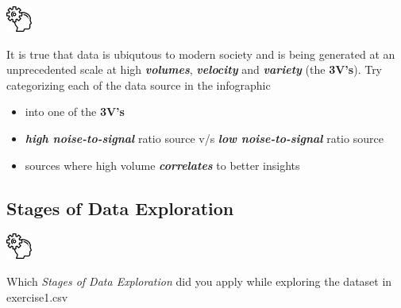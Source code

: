 \begin{minipage}[ht]{0.2\linewidth}
    \includegraphics[width=2\baselineskip]{./viz/icons/Think.png}  
\end{minipage}%
\begin{minipage}[ht]{0.75\linewidth}
It is true that data is ubiqutous to modern society and is being generated at an unprecedented scale at high \textbf{\emph{volumes}}, \textbf{\emph{velocity}} and \textbf{\emph{variety}} (the \textbf{3V's}). Try categorizing each of the data source in the infographic
\begin{itemize}
  \item into one of the \textbf{3V's}  
  \item \textbf{\emph{high noise-to-signal}} ratio source v/s \textbf{\emph{low noise-to-signal}} ratio source
  \item sources where high volume \textbf{\emph{correlates}} to better insights 
\end{itemize}
\end{minipage}

\subsection{Stages of Data Exploration}
\begin{mdframed}[backgroundcolor=cyan!10]
\par{}
\end{mdframed}

\begin{minipage}[ht]{0.2\linewidth}
    \includegraphics[width=2\baselineskip]{./viz/icons/Think.png}  
\end{minipage}%
\begin{minipage}[ht]{0.75\linewidth}
Which \emph{Stages of Data Exploration} did you apply while exploring the dataset in exercise1.csv
\end{minipage}

